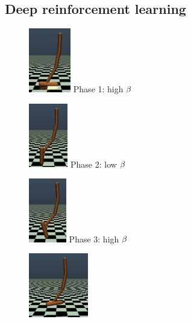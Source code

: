 \subsection{Deep reinforcement learning}
\begin{figure}[h]
    \centering
    \begin{minipage}[b]{0.17\linewidth}
    \centering
    \includegraphics[width=\textwidth,height=2.8cm]{fig/phase_0.png}
    Phase 1: high $\beta$
    \label{fig:phase_0}
    \end{minipage}
    \hspace{0.02cm}
    \begin{minipage}[b]{0.17\linewidth}
    \centering
    \includegraphics[width=\textwidth,height=2.8cm]{fig/phase_1.png}
    Phase 2: low $\beta$
    \label{fig:phase_1}
    \end{minipage}
    \hspace{0.02cm}
    \begin{minipage}[b]{0.17\linewidth}
    \centering
    \includegraphics[width=\textwidth,height=2.8cm]{fig/phase_2.png}
    Phase 3: high $\beta$
    \label{fig:phase_2}
    \end{minipage}
    \hspace{0.02cm}
    \begin{minipage}[b]{0.17\linewidth}
    \centering
    \includegraphics[width=\textwidth,height=2.8cm]{fig/phase_3.png}

\end{minipage}
\end{figure}
